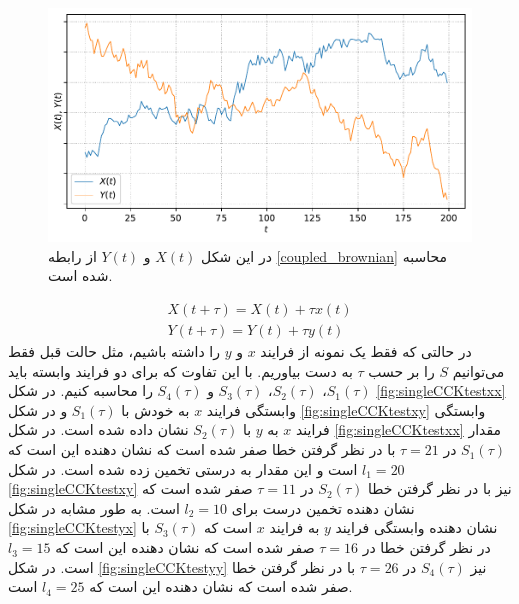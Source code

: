 \begin{figure}[H]
  \centering
  \includegraphics[width=\textwidth]{images/toy_model_sample_coup.pdf}
  \caption{در این شکل $X(t)$ و $Y(t)$ از رابطه \ref{coupled_brownian} محاسبه شده است.}\label{fig:coupledXY}
\end{figure}

\begin{equation}
  \begin{array}{l}
    X(t+\tau)=X(t)+\tau x(t) \\ Y(t+\tau)=Y(t)+\tau y(t)
    \label{coupled_brownian}
  \end{array}
\end{equation}
در حالتی که فقط یک نمونه از فرایند $x$ و $y$ را داشته باشیم، مثل حالت قبل فقط می‌توانیم $S$ را بر حسب $\tau$ به دست بیاوریم. 
با این تفاوت که برای دو فرایند وابسته باید $S_{1}(\tau)$، $S_{2}(\tau)$، $S_{3}(\tau)$ و $S_{4}(\tau)$ را محاسبه کنیم.
در شکل \ref{fig:singleCCKtestxx} وابستگی فرایند $x$ به خودش با $S_{1}(\tau)$ و در شکل \ref{fig:singleCCKtestxy} 
وابستگی فرایند $x$ به $y$ با $S_{2}(\tau)$ نشان داده شده است. در شکل \ref{fig:singleCCKtestxx} مقدار $S_{1}(\tau)$ 
در $\tau = 21$ با در نظر گرفتن خطا صفر شده است که نشان دهنده این است که $l_1 = 20$ است و این مقدار به درستی تخمین زده شده است.
در شکل \ref{fig:singleCCKtestxy} نیز با در نظر گرفتن خطا $S_{2}(\tau)$ در $\tau=11$ صفر شده است که نشان دهنده تخمین درست 
برای $l_2=10$ است. به طور مشابه در شکل \ref{fig:singleCCKtestyx} نشان دهنده وابستگی فرایند $y$ به فرایند $x$ است که $S_{3}(\tau)$ با در نظر گرفتن خطا 
در $\tau = 16$ صفر شده است که نشان دهنده این است که $l_3 = 15$ است. در شکل \ref{fig:singleCCKtestyy} نیز $S_{4}(\tau)$ 
در $\tau=26$ با در نظر گرفتن خطا صفر شده است که نشان دهنده این است که $l_4 = 25$ است.

